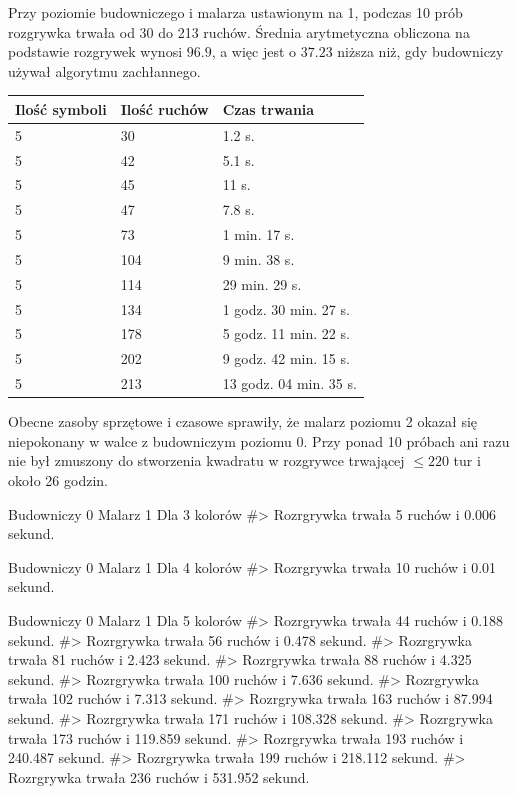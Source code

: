 \documentclass[document]{xmgr}
\begin{document}
\hfill \break
\hfill \break
\hfill \break
\hfill \break
\hfill \break
\hfill \break
\hfill \break
\hfill \break
\hfill \break
\hfill \break
\hfill \break
\hfill \break
Przy poziomie budowniczego i malarza ustawionym na 1, podczas 10 prób rozgrywka trwała od 30 do 213 ruchów. Średnia arytmetyczna obliczona na podstawie rozgrywek wynosi $96.9$, a więc jest o $37.23$ niższa niż, gdy budowniczy używał algorytmu zachłannego. 

\begin{table}[!h]
\begin{tabular}{|l|l|l|} \hline
Ilość symboli & Ilość ruchów & Czas trwania \\ \hline
5 & 30 & 1.2 s. \\ \hline
5 & 42 & 5.1 s. \\ \hline
5 & 45 & 11 s. \\ \hline
5 & 47 & 7.8 s. \\ \hline
5 & 73 & 1 min. 17 s. \\ \hline
5 & 104 & 9 min. 38 s. \\ \hline
5 & 114 & 29 min. 29 s. \\ \hline
5 & 134 & 1 godz. 30 min. 27 s.  \\ \hline
5 & 178 & 5 godz. 11 min. 22 s. \\ \hline
5 & 202 & 9 godz. 42 min. 15 s. \\ \hline
5 & 213 & 13 godz. 04 min. 35 s. \\ \hline
\end{tabular}
\end{table}


Obecne zasoby sprzętowe i czasowe sprawiły, że malarz poziomu 2 okazał się niepokonany w walce z budowniczym poziomu 0. Przy ponad 10 próbach ani razu nie był zmuszony do stworzenia kwadratu w rozgrywce trwającej $\leq 220$ tur i około 26 godzin.





\iffalse
Budowniczy 0
Malarz 1
Dla 3 kolorów 
#> Rozrgrywka trwała 5 ruchów i 0.006 sekund.

Budowniczy 0
Malarz 1
Dla 4 kolorów
#> Rozrgrywka trwała 10 ruchów i 0.01 sekund.

Budowniczy 0
Malarz 1
Dla 5 kolorów
#> Rozrgrywka trwała 44 ruchów i 0.188 sekund.
#> Rozrgrywka trwała 56 ruchów i 0.478 sekund.
#> Rozrgrywka trwała 81 ruchów i 2.423 sekund.
#> Rozrgrywka trwała 88 ruchów i 4.325 sekund.
#> Rozrgrywka trwała 100 ruchów i 7.636 sekund.
#> Rozrgrywka trwała 102 ruchów i 7.313 sekund.
#> Rozrgrywka trwała 163 ruchów i 87.994 sekund.
#> Rozrgrywka trwała 171 ruchów i 108.328 sekund.
#> Rozrgrywka trwała 173 ruchów i 119.859 sekund.
#> Rozrgrywka trwała 193 ruchów i 240.487 sekund.
#> Rozrgrywka trwała 199 ruchów i 218.112 sekund.
#> Rozrgrywka trwała 236 ruchów i 531.952 sekund.
\end{document}
